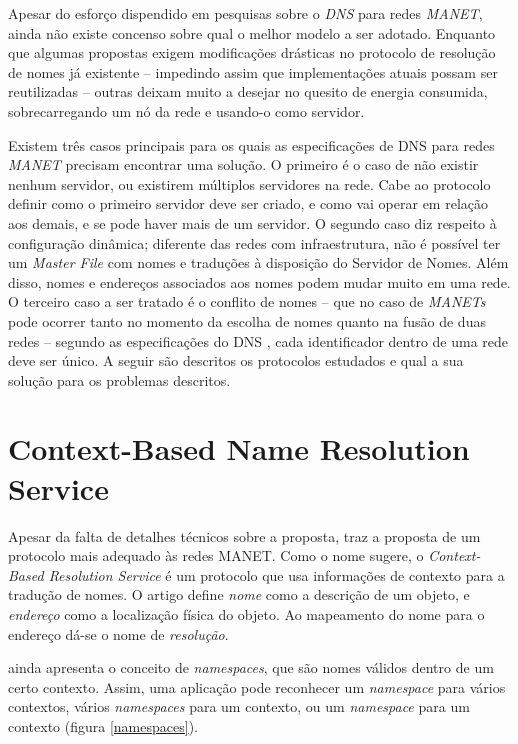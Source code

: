 
Apesar do esforço dispendido em pesquisas sobre o \textit{DNS} para redes 
\textit{MANET}, ainda não existe concenso sobre qual o melhor modelo a ser 
adotado. Enquanto que algumas propostas exigem modificações drásticas no 
protocolo de resolução de nomes já existente -- impedindo assim que 
implementações atuais possam ser reutilizadas -- outras deixam muito a desejar 
no quesito de energia consumida, sobrecarregando um nó da rede e usando-o como
 servidor.

Existem três casos principais para os quais as especificações de DNS para redes 
\textit{MANET} precisam encontrar uma solução. O primeiro é o caso de não existir 
nenhum servidor, ou existirem múltiplos servidores na rede. Cabe ao protocolo 
definir como o primeiro servidor deve ser criado, e como vai operar em relação 
aos demais, e se pode haver mais de um servidor. O segundo caso diz respeito à 
configuração dinâmica; diferente das redes com infraestrutura, não é possível 
ter um \textit{Master File} com nomes e traduções à disposição do Servidor de 
Nomes. Além disso, nomes e endereços associados aos nomes podem mudar muito em 
uma rede. O terceiro caso a ser tratado é o conflito de nomes -- que no caso de 
\textit{MANETs} pode ocorrer tanto no momento da escolha de nomes quanto na fusão
 de duas redes -- segundo as especificações do DNS \cite{rfc1035}, cada 
 identificador dentro de uma rede deve ser único. A seguir são descritos os 
 protocolos estudados e qual a sua solução para os problemas descritos.

\section{Context-Based Name Resolution Service}
\label{context-based}

    Apesar da falta de detalhes técnicos sobre a proposta, \cite{context-dns}
    traz a proposta de um protocolo mais adequado às redes MANET. Como o nome
    sugere, o \textit{Context-Based Resolution Service} é um protocolo que usa
    informações de contexto para a tradução de nomes. O artigo define \emph{nome}
    como a descrição de um objeto, e \emph{endereço} como a localização física do
    objeto. Ao mapeamento do nome para o endereço dá-se o nome de \emph{resolução}.
    
    \cite{context-dns} ainda apresenta o conceito de \textit{namespaces}, que são
    nomes válidos dentro de um certo contexto. Assim, uma aplicação pode reconhecer
    um \textit{namespace} para vários contextos, vários \textit{namespaces} para
    um contexto, ou um \textit{namespace} para um contexto (figura \ref{namespaces}).
    
